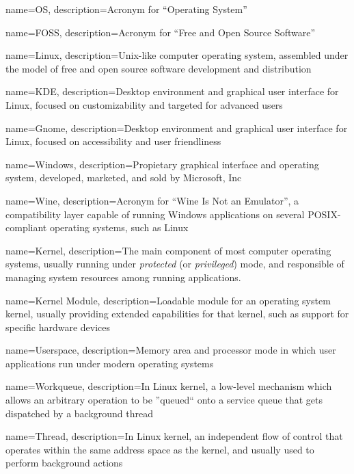 %
%

{
  name=OS,
  description={Acronym for ``Operating System''}
}

{
  name=FOSS,
  description={Acronym for ``Free and Open Source Software''}
}

{
  name=Linux,
  description={Unix-like computer operating system, assembled under the model of free and open source software development and distribution}
}

{
  name=KDE,
  description={Desktop environment and graphical user interface for Linux, focused on customizability and targeted for advanced users}
}

{
  name=Gnome,
  description={Desktop environment and graphical user interface for Linux, focused on accessibility and user friendliness}
}

{
  name=Windows,
  description={Propietary graphical interface and operating system, developed, marketed, and sold by Microsoft, Inc}
}

{
  name=Wine,
  description={Acronym for ``Wine Is Not an Emulator'', a compatibility layer capable of running Windows applications on several POSIX-compliant operating systems, such as Linux}
}

{
  name=Kernel,
  description={The main component of most computer operating systems, usually running under \emph{protected} (or \emph{privileged}) mode, and responsible of managing system resources among running applications.}
}

{
  name=Kernel Module,
  description={Loadable module for an operating system kernel, usually providing extended capabilities for that kernel,  such as support for specific hardware devices}
}

{
  name=Userspace,
  description={Memory area and processor mode in which user applications run under modern operating systems}
}

{
  name=Workqueue,
  description={In Linux kernel, a low-level mechanism which allows an arbitrary operation to be ''queued`` onto a service queue that gets dispatched by a background thread}
}

{
  name=Thread,
  description={In Linux kernel, an independent flow of control that operates within the same address space as the kernel, and usually used to perform background actions}
}

